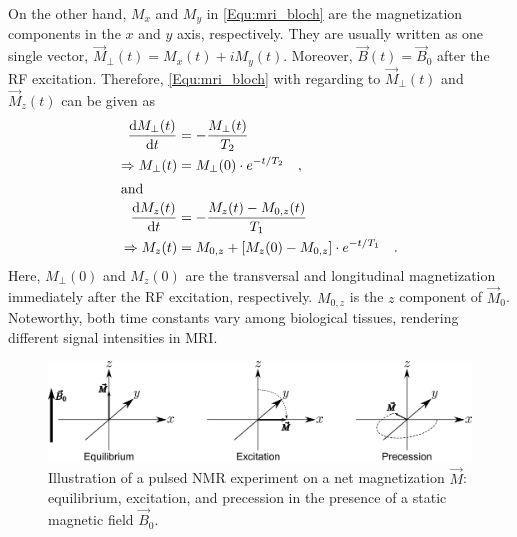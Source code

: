 On the other hand, $M_{x}$ and $M_{y}$ in \cref{Equ:mri_bloch} are the magnetization components in the $x$ and $y$ axis, respectively. They are usually written as one single vector, $\vec{M}_{\perp} (t) = M_{x} (t) + i M_{y} (t)$. Moreover, $\vec{B} (t) = \vec{B}_0$ after the RF excitation. Therefore, \cref{Equ:mri_bloch} with regarding to $\vec{M}_{\perp} (t)$ and $\vec{M}_{z} (t)$ can be given as
\begin{align}
  \frac{\text{d} M_{\perp}(t)}{\text{d} t} &= - \frac{M_{\perp}(t)}{T_2} \\
  \Rightarrow M_{\perp}(t) &= M_{\perp}(0) \cdot e^{-t/T_2} \label{Equ:mri_T2} \quad , \\
\intertext{and} 
  \frac{\text{d} M_{z}(t)}{\text{d} t} &= - \frac{M_{z}(t) - M_{0,z}(t)}{T_1} \\
  \Rightarrow M_{z}(t) &= M_{0,z} + [ M_{z}(0) - M_{0,z} ] \cdot e^{-t/T_1} \label{Equ:mri_T1} \quad .
\end{align}
Here, $M_{\perp}(0)$ and $M_{z}(0)$ are the transversal and longitudinal magnetization immediately after the RF excitation, respectively. $M_{0,z}$ is the $z$ component of $\vec{M}_0$. Noteworthy, both time constants vary among biological tissues, rendering different signal intensities in MRI.

\begin{figure}[tb]
  \centering
  \includegraphics[width=1.0\textwidth]{fig/mri-nmr.png}
  \caption{Illustration of a pulsed NMR experiment on a net magnetization $\vec{M}$: equilibrium, excitation, and precession in the presence of a static magnetic field $\vec{B}_0$.} \label{Fig:mri-nmr}
\end{figure}


